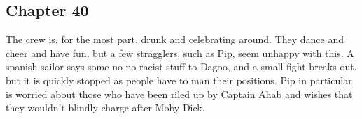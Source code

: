 \subsection{Chapter 40}

The crew is, for the most part, drunk and celebrating around. They dance and
cheer and have fun, but a few stragglers, such as Pip, seem unhappy with this.
A spanish sailor says some no no racist stuff to Dagoo, and a small fight
breaks out, but it is quickly stopped as people have to man their positions.
Pip in particular is worried about those who have been riled up by Captain Ahab
and wishes that they wouldn't blindly charge after Moby Dick.
